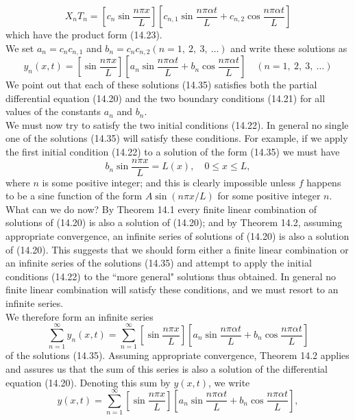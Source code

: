 \documentclass[11pt,a4paper, twoside]{report}
\begin{document}
	$$
	X_nT_n = \left[c_n\sin \frac{n \pi x}{L}\right]\left[c_{n,1}\sin \frac{n\pi \alpha t}{L} + c_{n, 2}\cos \frac{n\pi \alpha t}{L}\right]
	$$
	which have the product form (14.23).\\
	We set $a_n = c_nc_{n,1}$ and $b_n = c_nc_{n,2}(n = 1,\ 2,\ 3,\ \ldots)$ and write these solutions as
	\begin{equation}\tag{14.35}\label{14.35}
		y_n(x, t) = \left[\sin \frac{n\pi x}{L}\right]\left[a_n\sin \frac{n\pi \alpha t}{L} + b_n \cos \frac{n \pi \alpha t}{L}\right]\quad (n=1,\ 2,\ 3,\ \ldots)
	\end{equation}
	We point out that each of these solutions (14.35) satisfies both the partial differential equation (14.20) and the two boundary conditions (14.21) for all values of the constants $a_n$ and $b_n$.\\
	We must now try to satisfy the two initial conditions (14.22). In general no single one of the solutions (14.35) will satisfy these conditions. For example, if we apply the first initial condition (14.22) to a solution of the form (14.35) we must have
	$$
	b_n \sin \frac{n \pi x}{L} = L(x),\quad 0\leq x \leq L,
	$$
	where $n$ is some positive integer; and this is clearly impossible unless $f$ happens to be a sine function of the form $A\sin (n\pi x/L)$ for some positive integer $n$.\\
	What can we do now? By Theorem 14.1 every finite linear combination of solutions of (14.20) is also a solution of (14.20); and by Theorem 14.2, assuming appropriate convergence, an infinite series of solutions of (14.20) is also a solution of (14.20). This suggests that we should form either a finite linear combination or an infinite series of the solutions (14.35) and attempt to apply the initial conditions (14.22) to the “more general" solutions thus obtained. In general no finite linear combination will satisfy these conditions, and we must resort to an infinite series.\\
	We therefore form an infinite series
	$$
	\sum_{n=1}^\infty y_n(x,t) = \sum_{n=1}^\infty \left[\sin \frac{n \pi x}{L}\right]\left[a_n \sin\frac{n\pi\alpha t}{L} + b_n\cos \frac{n\pi \alpha t}{L}\right]
	$$
	of the solutions (14.35). Assuming appropriate convergence, Theorem 14.2 applies and assures us that the sum of this series is also a solution of the differential equation (14.20). Denoting this sum by $y(x, t)$, we write
	\begin{equation}\tag{14.36}\label{14.36}
		y(x, t) = \sum_{n=1}^\infty\left[\sin \frac{n\pi x}{L}\right]\left[a_n\sin \frac{n\pi \alpha t}{L} + b_n\cos \frac{n \pi \alpha t}{L}\right],
	\end{equation}
\end{document}
